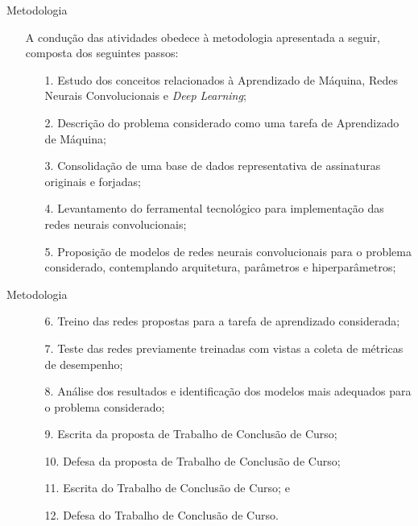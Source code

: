 
\begin{frame}{Metodologia}
	\begin{itemize}
		\item[] A condução das atividades obedece à metodologia apresentada a seguir, composta dos seguintes passos:
		\medskip
		\begin{itemize}
			\footnotesize
			\item[1.] Estudo dos conceitos relacionados à Aprendizado de Máquina, Redes Neurais Convolucionais e \emph{Deep Learning};
			\medskip
			\medskip
			\item[2.] Descrição do problema considerado como uma tarefa de Aprendizado de Máquina;
			\medskip
			\medskip
			\item[3.] Consolidação de uma base de dados representativa de assinaturas originais e forjadas;
			\medskip
			\medskip
			\item[4.] Levantamento do ferramental tecnológico para implementação das redes neurais convolucionais;
			\medskip
			\medskip
			\item[5.] Proposição de modelos de redes neurais convolucionais para o problema considerado, contemplando arquitetura, parâmetros e hiperparâmetros;
		\end{itemize}
	\end{itemize}
\end{frame}

\begin{frame}{Metodologia}
\begin{itemize}
	\item[]
	\begin{itemize}
		\footnotesize
		\item[6.] Treino das redes propostas para a tarefa de aprendizado considerada;
		\medskip
		\medskip
		\item[7.] Teste das redes previamente treinadas com vistas a coleta de métricas de desempenho;
		\medskip
		\medskip
		\item[8.] Análise dos resultados e identificação dos modelos mais adequados para o problema considerado;
		\medskip
		\medskip
		\item[9.] Escrita da proposta de Trabalho de Conclusão de Curso;
		\medskip
		\medskip
		\item[10.] Defesa da proposta de Trabalho de Conclusão de Curso;
		\medskip
		\medskip
		\item[11.] Escrita do Trabalho de Conclusão de Curso; e
		\medskip
		\medskip
		\item[12.] Defesa do Trabalho de Conclusão de Curso.
	\end{itemize}
\end{itemize}
\end{frame}

